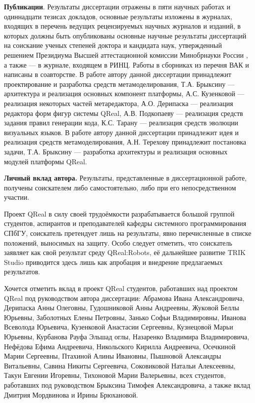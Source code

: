 \textbf{Публикации}. Результаты диссертации отражены в пяти научных работах и одиннадцати тезисах докладов, 
основные результаты изложены в журналах, входящих в перечень ведущих рецензируемых научных 
журналов и изданий, в которых должны быть опубликованы основные научные результаты диссертаций 
на соискание ученых степеней доктора и кандидата наук, утвержденный решением Президиума 
Высшей аттестационной комиссии Минобрнауки России ,
а также \cite{terekhov2009architecture, osechkina2010gestures} --- в журнале, входящем в РИНЦ. 
Работы в сборниках из перечня ВАК  и 
написаны в соавторстве. В работе  автору данной диссертации 
принадлежит проектирование и разработка средств метамоделирования, Т.А. Брыксину --- архитектура и реализация основных
компонент платформы, А.С. Кузенковой --- реализация некоторых частей метаредактора, А.О. Дерипаска
--- реализация редактора форм фигур системы QReal, А.В. Подкопаеву --- реализация средств задания правил генерации кода,
К.С. Тарану --- реализация средств эволюции визуальных языков. В работе 
автору данной диссертации принадлежит идея и реализация средств метамоделирования, А.Н. Терехову 
принадлежит постановка задачи, Т.А. Брыксину --- разработка архитектуры и реализация основных модулей платформы QReal.

\textbf{Личный вклад автора.} Результаты, представленные в диссертационной работе, получены 
соискателем либо самостоятельно, либо при его непосредственном участии.

Проект QReal в силу своей трудоёмкости разрабатывается большой группой студентов, аспирантов
и преподавателей кафедры системного программирования СПбГУ, соискатель претендует лишь на
результаты, явно перечисленные в списке положений, выносимых на защиту. Особо следует отметить,
что соискатель заявляет как свой результат среду QReal:Robots, её дальнейшее развитие 
TRIK Studio приводится здесь лишь как апробация и внедрение предлагаемых результатов.

Хочется отметить вклад в проект QReal студентов, работавших над проектом QReal под руководством автора 
диссертации: Абрамова Ивана Александровича, Дерипаска Анны Олеговны, Гудошниковой Анны Андреевны, 
Жуковой Беллы Юрьевны, Заболотных Елены Петровны, Занько Софьи Владимировны, Иванова Всеволода Юрьевича, 
Кузенковой Анастасии Сергеевны, Кузнецовой Марьи Юрьевны, Курбанова Рауфа Эльшад оглы, 
Назаренко Владимира Владимировича, Нефёдова Ефима Андреевича, Никольского Кирилла Андреевича, 
Осечкиной Марии Сергеевны, Птахиной Алины Ивановны, Пышновой Александры Витальевны, 
Савина Никиты Сергеевича, Соковиковой Натальи Алексеевны, Такун Евгении Игоревны, 
Тихоновой Марии Валерьевны, всех студентов, работавших под руководством Брыксина Тимофея Александровича, 
а также вклад Дмитрия Мордвинова и Ирины Брюхановой.

